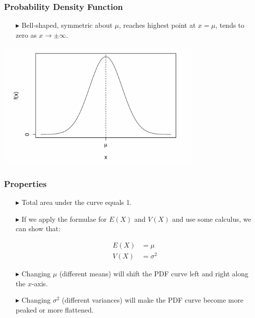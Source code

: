 \documentclass[12pt]{beamer}
\begin{document}
\begin{frame}
	\frametitle{Probability Density Function}
	
	\begin{itemize}
		\item[\color{blue}$\blacktriangleright$] Bell-shaped, symmetric about $\mu$, reaches highest point at $x=\mu$, tends to zero as $x\rightarrow\pm\infty$.
		

	\end{itemize}
	\centering
\includegraphics[width=10cm]{normal.png}
\end{frame}
\begin{frame}
	\frametitle{Properties}
	
	\begin{itemize}
		\item[\color{blue}$\blacktriangleright$] Total area under the curve equals 1.
		
		\item[\color{blue}$\blacktriangleright$] If we apply the formulae for $E(X)$ and $V(X)$ and 
		use some calculus, we can show that:
		
		\vspace{0.5em}
		\begin{align*}
			E(X) &= \mu \\
			V(X) &= \sigma^2
		\end{align*}
		\vspace{0.5em}
		
		\item[\color{blue}$\blacktriangleright$] Changing $\mu$ (different means) will shift the PDF 
		curve left and right along the $x$-axis.
		
		\item[\color{blue}$\blacktriangleright$] Changing $\sigma^2$ (different variances) will make the 
		PDF curve become more peaked or more flattened.
	\end{itemize}
	
\end{frame}
\end{document}
